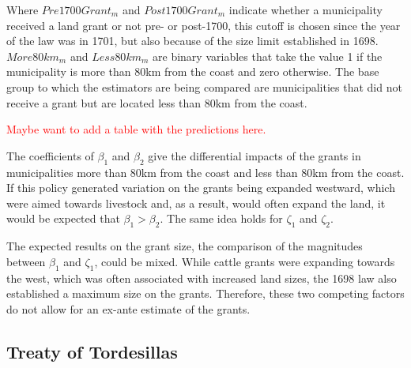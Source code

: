\documentclass[11pt]{article}
\newcommand{\red}[1]{\textcolor{red}{#1}}
\begin{document}
Where $Pre1700Grant_m$ and $Post1700Grant_m$ indicate whether a municipality received a land grant or not pre- or post-1700, this cutoff is chosen since the year of the law was in 1701, but also because of the size limit established in 1698. 
$More80km_m$ and $Less80km_m$ are binary variables that take the value 1 if the municipality is more than 80km from the coast and zero otherwise.
The base group to which the estimators are being compared are municipalities that did not receive a grant but are located less than 80km from the coast.

\red{Maybe want to add a table with the predictions here.}

The coefficients of $\beta_1$ and $\beta_2$ give the differential impacts of the grants in municipalities more than 80km from the coast and less than 80km from the coast. 
If this policy generated variation on the grants being expanded westward, which were aimed towards livestock and, as a result, would often expand the land, it would be expected that $\beta_1 > \beta_2$. 
The same idea holds for $\zeta_1$ and $\zeta_2$. 

The expected results on the grant size, the comparison of the magnitudes between $\beta_1$ and $\zeta_1$, could be mixed. 
While cattle grants were expanding towards the west, which was often associated with increased land sizes, the 1698 law also established a maximum size on the grants. 
Therefore, these two competing factors do not allow for an ex-ante estimate of the grants.





\subsection{Treaty of Tordesillas}
\label{sec:tordesillas} 
\end{document}
